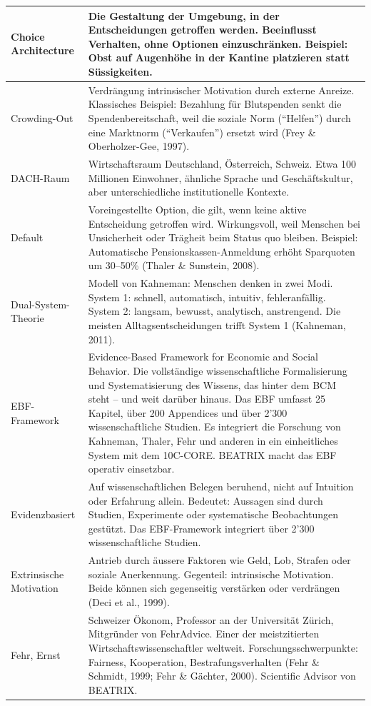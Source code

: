 \documentclass[11pt,a4paper]{article}
\begin{document}
\begin{longtable}{@{}L{4cm}L{10cm}@{}}
\midrule
Choice Architecture & Die Gestaltung der Umgebung, in der Entscheidungen getroffen werden. Beeinflusst Verhalten, ohne Optionen einzuschränken. Beispiel: Obst auf Augenhöhe in der Kantine platzieren statt Süssigkeiten. \\
\midrule
Crowding-Out & Verdrängung intrinsischer Motivation durch externe Anreize. Klassisches Beispiel: Bezahlung für Blutspenden senkt die Spendenbereitschaft, weil die soziale Norm (``Helfen'') durch eine Marktnorm (``Verkaufen'') ersetzt wird (Frey \& Oberholzer-Gee, 1997). \\
\midrule
DACH-Raum & Wirtschaftsraum Deutschland, Österreich, Schweiz. Etwa 100 Millionen Einwohner, ähnliche Sprache und Geschäftskultur, aber unterschiedliche institutionelle Kontexte. \\
\midrule
Default & Voreingestellte Option, die gilt, wenn keine aktive Entscheidung getroffen wird. Wirkungsvoll, weil Menschen bei Unsicherheit oder Trägheit beim Status quo bleiben. Beispiel: Automatische Pensionskassen-Anmeldung erhöht Sparquoten um 30--50\% (Thaler \& Sunstein, 2008). \\
\midrule
Dual-System-Theorie & Modell von Kahneman: Menschen denken in zwei Modi. System 1: schnell, automatisch, intuitiv, fehleranfällig. System 2: langsam, bewusst, analytisch, anstrengend. Die meisten Alltagsentscheidungen trifft System 1 (Kahneman, 2011). \\
\midrule
EBF-Framework & Evidence-Based Framework for Economic and Social Behavior. Die vollständige wissenschaftliche Formalisierung und Systematisierung des Wissens, das hinter dem BCM steht -- und weit darüber hinaus. Das EBF umfasst 25 Kapitel, über 200 Appendices und über 2'300 wissenschaftliche Studien. Es integriert die Forschung von Kahneman, Thaler, Fehr und anderen in ein einheitliches System mit dem 10C-CORE. BEATRIX macht das EBF operativ einsetzbar. \\
\midrule
Evidenzbasiert & Auf wissenschaftlichen Belegen beruhend, nicht auf Intuition oder Erfahrung allein. Bedeutet: Aussagen sind durch Studien, Experimente oder systematische Beobachtungen gestützt. Das EBF-Framework integriert über 2'300 wissenschaftliche Studien. \\
\midrule
Extrinsische Motivation & Antrieb durch äussere Faktoren wie Geld, Lob, Strafen oder soziale Anerkennung. Gegenteil: intrinsische Motivation. Beide können sich gegenseitig verstärken oder verdrängen (Deci et al., 1999). \\
\midrule
Fehr, Ernst & Schweizer Ökonom, Professor an der Universität Zürich, Mitgründer von FehrAdvice. Einer der meistzitierten Wirtschaftswissenschaftler weltweit. Forschungsschwerpunkte: Fairness, Kooperation, Bestrafungsverhalten (Fehr \& Schmidt, 1999; Fehr \& Gächter, 2000). Scientific Advisor von BEATRIX. \\

\end{longtable}
\end{document}
